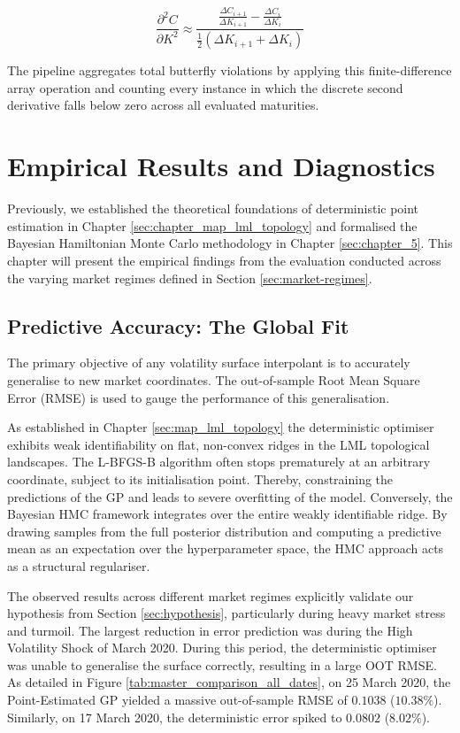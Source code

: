 \documentclass[12pt,oneside]{report}
\theoremstyle{definition}
\theoremstyle{remark}
\begin{document}
\begin{enumerate}
\begin{equation}
    \frac{\partial^2 C}{\partial K^2} \approx \frac{\frac{\Delta C_{i+1}}{\Delta K_{i+1}} - \frac{\Delta C_i}{\Delta K_i}}{\frac{1}{2}(\Delta K_{i+1} + \Delta K_i)}
\end{equation}

The pipeline aggregates total butterfly violations by applying this finite-difference array operation and counting every instance in which the discrete second derivative falls below zero across all evaluated maturities.
\end{enumerate}


\chapter{Empirical Results and Diagnostics}

Previously, we established the theoretical foundations of deterministic point estimation in Chapter \ref{sec:chapter_map_lml_topology} and formalised the Bayesian Hamiltonian Monte Carlo methodology in Chapter \ref{sec:chapter_5}. This chapter will present the empirical findings from the evaluation conducted across the varying market regimes defined in Section \ref{sec:market-regimes}.

\section{Predictive Accuracy: The Global Fit}
\label{sec:the_global_fit}
The primary objective of any volatility surface interpolant is to accurately generalise to new market coordinates. The out-of-sample Root Mean Square Error (RMSE) is used to gauge the performance of this generalisation. 

As established in Chapter \ref{sec:map_lml_topology}  the deterministic optimiser exhibits weak identifiability on flat, non-convex ridges in the LML topological landscapes. The L-BFGS-B algorithm often stops prematurely at an arbitrary coordinate, subject to its initialisation point. Thereby, constraining the predictions of the GP and leads to severe overfitting of the model. Conversely, the Bayesian HMC framework integrates over the entire weakly identifiable ridge. By drawing samples from the full posterior distribution and computing a predictive mean as an expectation over the hyperparameter space, the HMC approach acts as a structural regulariser. 


The observed results across different market regimes explicitly validate our hypothesis from Section \ref{sec:hypothesis}, particularly during heavy market stress and turmoil. The largest reduction in error prediction was during the High Volatility Shock of March 2020. During this period, the deterministic optimiser was unable to generalise the surface correctly, resulting in a large OOT RMSE. As detailed in Figure \ref{tab:master_comparison_all_dates}, on 25 March 2020, the Point-Estimated GP yielded a massive out-of-sample RMSE of $0.1038$ ($10.38\%$). Similarly, on 17 March 2020, the deterministic error spiked to $0.0802$ ($8.02\%$).
\end{document}
